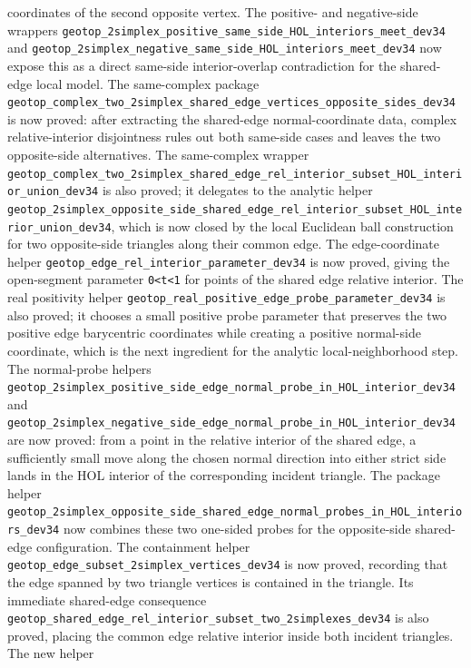 \documentclass{article}
\begin{document}
coordinates of the second opposite vertex. The positive- and negative-side
wrappers
\texttt{geotop\_2simplex\_positive\_same\_side\_HOL\_interiors\_meet\_dev34}
and
\texttt{geotop\_2simplex\_negative\_same\_side\_HOL\_interiors\_meet\_dev34}
now expose this as a direct same-side interior-overlap contradiction for the
shared-edge local model. The same-complex package
\texttt{geotop\_complex\_two\_2simplex\_shared\_edge\_vertices\_opposite\_sides\_dev34}
is now proved: after extracting the shared-edge normal-coordinate data, complex
relative-interior disjointness rules out both same-side cases and leaves the
two opposite-side alternatives. The same-complex wrapper
\texttt{geotop\_complex\_two\_2simplex\_shared\_edge\_rel\_interior\_subset\_HOL\_interior\_union\_dev34}
is also proved; it delegates to the analytic helper
\texttt{geotop\_2simplex\_opposite\_side\_shared\_edge\_rel\_interior\_subset\_HOL\_interior\_union\_dev34},
which is now closed by the local Euclidean ball construction for two
opposite-side triangles along their common edge. The edge-coordinate
helper \texttt{geotop\_edge\_rel\_interior\_parameter\_dev34} is now proved,
giving the open-segment parameter \texttt{0<t<1} for points of the shared edge
relative interior. The real positivity helper
\texttt{geotop\_real\_positive\_edge\_probe\_parameter\_dev34} is also proved;
it chooses a small positive probe parameter that preserves the two positive
edge barycentric coordinates while creating a positive normal-side coordinate,
which is the next ingredient for the analytic local-neighborhood step. The
normal-probe helpers
\texttt{geotop\_2simplex\_positive\_side\_edge\_normal\_probe\_in\_HOL\_interior\_dev34}
and
\texttt{geotop\_2simplex\_negative\_side\_edge\_normal\_probe\_in\_HOL\_interior\_dev34}
are now proved: from a point in the relative interior of the shared edge, a
sufficiently small move along the chosen normal direction into either strict
side lands in the HOL interior of the corresponding incident triangle. The
package helper
\texttt{geotop\_2simplex\_opposite\_side\_shared\_edge\_normal\_probes\_in\_HOL\_interiors\_dev34}
now combines these two one-sided probes for the opposite-side shared-edge
configuration. The containment helper
\texttt{geotop\_edge\_subset\_2simplex\_vertices\_dev34} is now proved,
recording that the edge spanned by two triangle vertices is contained in the
triangle. Its immediate shared-edge consequence
\texttt{geotop\_shared\_edge\_rel\_interior\_subset\_two\_2simplexes\_dev34} is
also proved, placing the common edge relative interior inside both incident
triangles. The new helper
\end{document}
